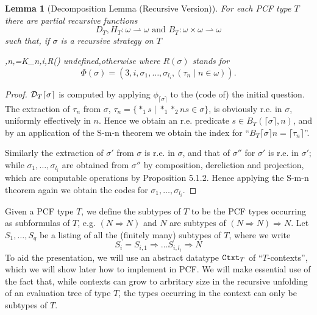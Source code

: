 \documentclass[11pt]{article}
\newtheorem{lemma}[theorem]{Lemma}
\newcommand{\D}{{\cal D}}
\newcommand{\lang}{\langle}
\newcommand{\rang}{\rangle}
\begin{document}
\begin{lemma}[Decomposition Lemma (Recursive Version)]
For each PCF type $T$ there are partial recursive functions
$$D_T,H_T:\omega\rightharpoonup\omega\mbox{ and } B_T:\omega\times\omega
\rightharpoonup\omega$$
such that, if $\sigma$ is a recursive strategy on $T$

{\lang 2,n\rang ,}{\sigma=K_{}n}{\lang 3,i\rang ,}{R(\sigma)}
\casodue{H_T\lceil\sigma\rceil}{\lang \lceil\sigma_1\rceil,\dots,\lceil\sigma_{l_i}
\rceil\rang ,}{R(\sigma)}{\mbox{undefined},}{\mbox{otherwise}}
{\mbox{undefined},}{\mbox{otherwise}}
where $R(\sigma)$ stands for
$$\Phi(\sigma)=(3,i,\sigma_1,\dots,\sigma_{l_i},
(\tau_n\mid n\in\omega)).$$
\end{lemma}
\begin{proof} $\D_T\lceil\sigma\rceil$ is computed by applying
$\phi_{\lceil\sigma \rceil}$ to the (code of) the initial
question. The extraction of $\tau_n$ from $\sigma$,
$\tau_n=\{*_1s\mid  *_1*_2ns\in\sigma \}$, is obviously r.e. in
$\sigma$, uniformly effectively in $n$. Hence we obtain an r.e.
predicate $s\in B_T(\lceil\sigma\rceil,n)$, and by an application
of the \textsf{S-m-n} theorem we obtain the index for
``$B_T\lceil\sigma\rceil n =\lceil\tau_n\rceil$''.

Similarly the extraction of $\sigma'$ from $\sigma$ is r.e. in
$\sigma$, and that of $\sigma''$ for $\sigma'$ is r.e. in
$\sigma'$; while $\sigma_1, \dots,\sigma_{l_i}$ are obtained from
$\sigma''$ by composition, dereliction and projection, which are
computable operations by Proposition 5.1.2. Hence applying the
\textsf{S-m-n} theorem again we obtain the codes for $\sigma_1,
\dots,\sigma_{l_i}$.
\end{proof}

Given a PCF type $T$, we define the subtypes of $T$ to be the PCF
types occurring as subformulas of $T$, e.g. $(N\Rightarrow N)$ and
$N$ are subtypes of $(N\Rightarrow N)\Rightarrow N$. Let
$S_1,\dots,S_q$ be a listing of all the (finitely many) subtypes
of $T$, where we write $$S_i=S_{i,1}\Rightarrow\dots
S_{i,l_i}\Rightarrow N$$ To aid the presentation, we will use an
abstract datatype ${\tt Ctxt}_T$ of ``$T$-contexts'', which we
will show later how to implement in PCF. We will make essential
use of the fact that, while contexts can grow to arbritary size in
the recursive unfolding of an evaluation tree of type $T$, the
types occurring in the context can only be subtypes of $T$.
\end{document}
